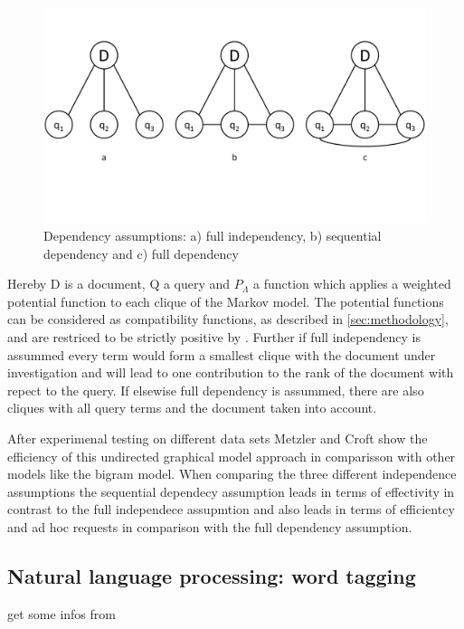 \begin{figure}[htpb]
  \centering
  	\includegraphics[scale=0.4]{img/termdep.pdf}
  \caption{Dependency assumptions: a) full independency, b) sequential dependency and c) full dependency}
  \label{fig:termdep}
\end{figure}

Hereby D is a document, Q a query and $P_\Lambda$ a function which applies a weighted potential function to each clique of the Markov model. The potential functions can be considered as compatibility functions, as described in \ref{sec:methodology}, and are restriced to be strictly positive by \cite{metzler2005markov}. Further if full independency is assummed every term would form a smallest clique with the document under investigation and will lead to one contribution to the rank of the document with repect to the query. If elsewise full dependency is assummed, there are also cliques with all query terms and the document taken into account.

After experimenal testing on different data sets Metzler and Croft show the efficiency of this undirected graphical model approach in comparisson with other models like the bigram model. When comparing the three different independence assumptions the sequential dependecy assumption leads in terms of effectivity in contrast to the full independece assupmtion and also leads in terms of efficientcy and ad hoc requests in comparison with the full dependency assumption.


\subsection{Natural language processing: word tagging}
\label{sec:tag}

get some infos from \cite{collobert2011natural}


